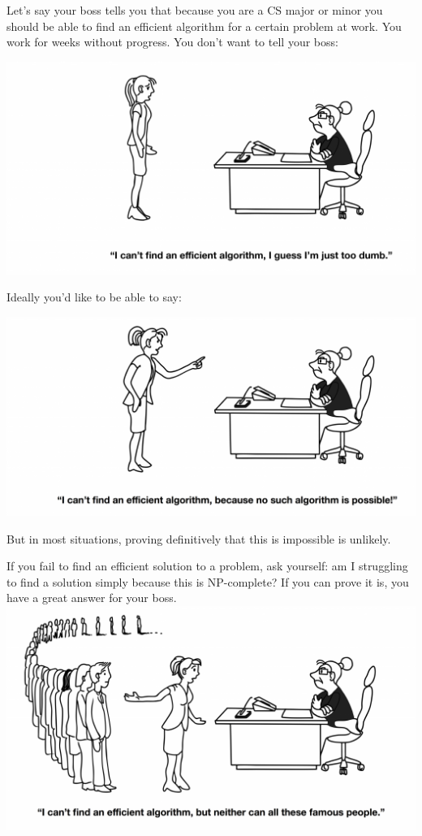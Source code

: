 \documentclass[11  pt]{article}
\begin{document}
	Let's say your boss tells you that because you are a CS major or minor you should be able to find an efficient algorithm for a certain problem at work. You work for weeks without progress. You don't want to tell your boss:
	
	\includegraphics[width=\linewidth]{cartoon.png}
	
	Ideally you'd like to be able to say:
	
	\includegraphics[width=\linewidth]{cartoon2.png}
	
	But in most situations, proving definitively that this is impossible is unlikely.
	\newpage
	
	If you fail to find an efficient solution to a problem, ask yourself: am I struggling to find a solution simply because this is NP-complete? If you can prove it is, you have a great answer for your boss.\\
	
	\includegraphics[width=\linewidth]{cartoon3.png}
	
\end{document}
